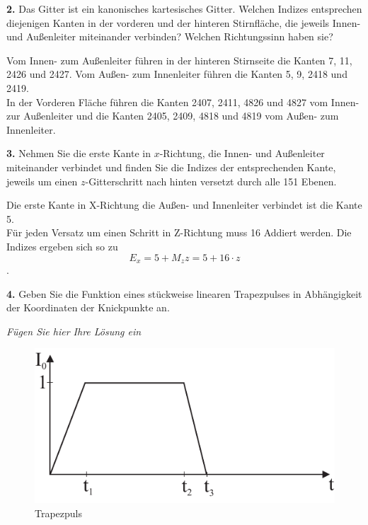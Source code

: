 \documentclass[Protokollheft.tex]{subfiles}
\begin{document}
\begin{framed}
	\noindent \textbf{2.} Das Gitter ist ein kanonisches kartesisches Gitter. Welchen
Indizes entsprechen diejenigen Kanten in der vorderen und der hinteren
Stirnfläche, die jeweils Innen- und Außenleiter miteinander
verbinden? Welchen Richtungssinn haben sie?\label{exer:idxConductorInterconnection}
\end{framed}

Vom Innen- zum Außenleiter führen in der hinteren Stirnseite die Kanten 7, 11, 2426 und 2427. Vom Außen- zum Innenleiter führen die Kanten 5, 9, 2418 und 2419. \\
In der Vorderen Fläche führen die Kanten 2407, 2411, 4826 und 4827 vom Innen- zur Außenleiter
und die Kanten 2405, 2409, 4818 und 4819 vom Außen- zum Innenleiter. 
\begin{framed}
	\noindent \textbf{3.} Nehmen Sie die erste Kante in $x$-Richtung, die Innen- und Außenleiter
miteinander verbindet und finden Sie die Indizes der
entsprechenden Kante, jeweils um einen $z$-Gitterschritt nach
hinten versetzt durch alle 151 Ebenen.\label{exer:idxEdge4allZ}
\end{framed}

Die erste Kante in X-Richtung die Außen- und Innenleiter verbindet ist die Kante 5. \\
Für jeden Versatz um einen Schritt in Z-Richtung muss 16 Addiert werden. Die Indizes ergeben sich so zu 
\begin{equation}
	E_x = 5+M_zz = 5 + 16\cdot z
\end{equation}
.
\begin{framed}
	\noindent \textbf{4.} Geben Sie die Funktion eines stückweise linearen
Trapezpulses in Abhängigkeit der Koordinaten der Knickpunkte an.\label{exer:calcPiecewiseTrapezoidal}
\end{framed}

\emph{Fügen Sie hier Ihre Lösung ein}

\begin{figure}[ht]
	\centering
    \includegraphics[scale=0.9]{v7_trapez.pdf}
    \caption{Trapezpuls}\label{tra}
\end{figure}
\end{document}
